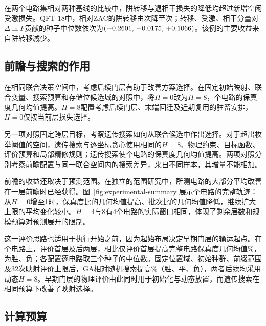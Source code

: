 在两个电路集相对两种基线的比较中，阱转移与退相干损失的降低均超过新增空闲受激损失。QFT-18中，相对ZAC的阱转移由\GAMainMechanismQFTBaseTransfers 次降至\GAMainMechanismQFTGATransfers 次；转移、受激、相干分量对$\Delta\ln F$贡献的种子中位数依次为\mbox{$(+0.2601,\,-0.0175,\,+0.1066)$}。该例的主要收益来自阱转移减少。

\subsection{前瞻与搜索的作用}
\label{sec:ablation}

在相同联合决策空间中，考虑后续门层有助于改善方案选择。在固定初始映射、联合变量、搜索预算和存储位候选域的对照中，将$H=0$改为$H=8$，\AblationHN 个电路的保真度几何均值提高。$H=8$配置考虑后续门层、末端回迁及近期复用的驻留安排，$H=0$仅按当前层损失选择。

另一项对照固定跨层目标，考察遗传搜索如何从联合候选中作出选择。对于超出枚举阈值的空间，遗传搜索与逐坐标贪心使用相同的$H=8$、物理约束、目标函数、评价预算和局部精修规则；遗传搜索使\AblationGAN 个电路的保真度几何均值提高。两项对照分别考察前瞻配置与同一联合空间内的搜索差异，来自不同样本，其增量不能相加。

\label{sec:horizon-evaluation}
前瞻的收益还取决于预测范围。在独立的范围研究中，所测电路的大部分平均改善在一层前瞻时已经获得。图~\ref{fig:experimental-summary}展示\HorizonExtCompleteN 个电路的完整轨迹：从$H=0$增至1时，保真度比的几何均值提高、批次比的几何均值降低，继续扩大上限的平均变化较小。$H=4$与8有4个电路的实际窗口相同，体现了剩余层数和规模预算对预测展开的限制。



\label{sec:init-evaluation}
这一评价思路也适用于执行开始之前，因为起始布局决定早期门层的输运起点。在\PhysicalInitSearchCompleteN 个电路上，评价首层及后两层，相比仅评价首层提高完整电路保真度几何均值\PhysicalInitGaVsHZeroGainPercent\%，为\PhysicalInitGaVsHZeroWins 胜、\PhysicalInitGaVsHZeroLosses 负；各配置逐电路取三个种子的中位数。固定位置域、初始种群、前缀范围及32次映射评价上限后，GA相对随机搜索提高\PhysicalInitGaVsRandomGainPercent\%（\PhysicalInitGaVsRandomWins 胜、\PhysicalInitGaVsRandomTies 平、\PhysicalInitGaVsRandomLosses 负），两者后续均采用动态$H=8$。早期门层的物理评价由此同时用于初始化与动态放置，而遗传搜索在相同预算下改善了映射选择。

\subsection{计算预算}
\label{sec:runtime-evaluation}

